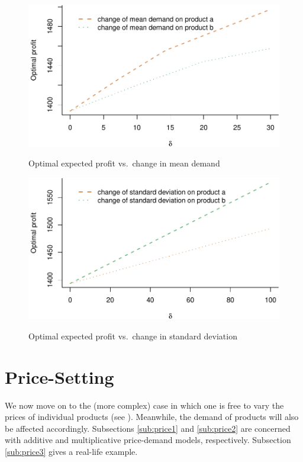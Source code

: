 \documentclass[a4paper,11pt]{article}
\begin{document}
\begin{figure}[htb]
\centering
\caption{Optimal expected profit vs.\ change in mean demand}
\includegraphics{Example-figure_files/figure-latex/mean-1.pdf}
\label{fig:simple1}
\end{figure}

\begin{figure}[htb]
\centering
\caption{Optimal expected profit vs.\ change in standard deviation}
\includegraphics{Example-figure_files/figure-latex/var-1.pdf}
\label{fig:simple2}
\end{figure}

\section{Price-Setting}
\label{se:price}

We now move on to the (more complex) case in which one is free to vary the prices of individual products (see \cite{De20,PD99}). Meanwhile, the demand of products will also be affected accordingly. Subsections \ref{sub:price1} and \ref{sub:price2} are concerned with additive and multiplicative price-demand models, respectively. Subsection \ref{sub:price3} gives a real-life example.
\end{document}

